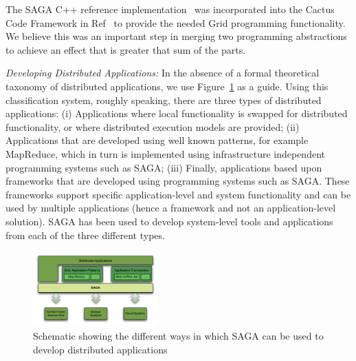 \documentclass{sig-alternate}
\newcommand{\up}{\vspace*{-0.3em}}
\begin{document}
The SAGA C++ reference implementation~\cite{saga_web} was incorporated
into the Cactus Code Framework in Ref~\cite{escience07} to provide the
needed Grid programming functionality.  We believe this was an
important step in merging two programming abstractions to achieve an
effect that is greater that sum of the parts. 

{\it Developing Distributed Applications: } In the absence of a formal theoretical taxonomy of distributed applications, we use Figure~\ref{sagaapps} as a guide.  Using this classification system, roughly speaking, there are three types of distributed applications: (i) Applications where local functionality is swapped for distributed functionality, or where distributed execution models are provided; (ii) Applications that are developed using well known patterns, for example MapReduce, which in turn is implemented using infrastructure independent programming systems such as SAGA; (iii) Finally, applications based upon frameworks that are developed using programming systems such as SAGA. These frameworks support specific application-level and system functionality and can be used by multiple applications (hence a framework and not an application-level solution).  SAGA has been used to develop system-level tools and applications from each of the three different types.  
\begin{figure}[!ht]
 \begin{center}
\up\up\up\up%
\includegraphics[width=0.43\textwidth]{stci_saga_figures.pdf}
\end{center}
  \caption{\small Schematic showing the different ways in which
    SAGA can be used to develop distributed applications}
\up\up\up\up
 \label{sagaapps}
\end{figure} 
\end{document}
